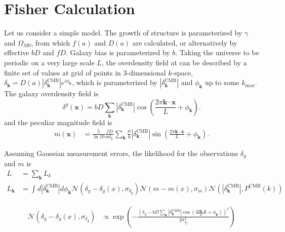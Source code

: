 \documentclass[11pt, oneside]{article}   	%
\begin{document}
\section{Fisher Calculation}
Let us consider a simple model.
The growth of structure is
parameterized by $\gamma$ and $\Omega_{M0}$, from which 
$f(a)$ and $D(a)$ are calculated,
or alternatively by effective
$bD$ and $fD$.
Galaxy bias is parameterized by $b$.
Taking the universe to be periodic
on a very large scale $L$, 
the overdensity field at
can be
described by a finite set
of values
at grid of points in 3-dimensional
$k$-space, $\delta_{\mathbf{k}} = D(a) |\delta^{\text{CMB}}_{\mathbf{k}}| e^{i\phi_{\mathbf{k}}}$,
which is parameterized by
$|\delta^{\text{CMB}}_{\mathbf{k}}|$
and $\phi_{\mathbf{k}}$ up to some
$k_{\text{max}}$.  The galaxy
overdensity field is
\begin{equation}
    \delta^g(\mathbf{x}) = bD \sum_{\mathbf{k}} |\delta^{\text{CMB}}_\mathbf{k}| \cos{\left(\frac{2\pi \mathbf{k} \cdot \mathbf{x}}{L} + \phi_\mathbf{k}\right)}.
\end{equation}
and the peculiar magnitude field is
\begin{align}
       m(\mathbf{x})
       & = \frac{5}{\ln{10}}\frac{fD}{ad_L} \sum_{\mathbf{k}}
       \frac{\mu}{k} |\delta^{\text{CMB}}_\mathbf{k}| \sin{\left(\frac{2\pi \mathbf{k} \cdot \mathbf{x}}{L} + \phi_\mathbf{k}\right)}.
\end{align}

Assuming Gaussian measurement
errors, the likelihood for
the observations $\delta_g$
and $m$ is
\begin{align}
    L& =\sum_\mathbf{k} L_k\\
    L_\mathbf{k}& = \int d|\delta^{\text{CMB}}_\mathbf{k}| d\phi_\mathbf{k}
    \mathcal{N}(\delta_g-\delta_g(x),\sigma_{\delta_g})
    \mathcal{N}(m-m(x),\sigma_m)
    \mathcal{N}(|\delta^{\text{CMB}}_\mathbf{k}|,P^{\text{CMB}}(k))
\end{align}

\begin{align}
     \mathcal{N}(\delta_g-\delta_g(x),\sigma_{\delta_g})& \propto
         \exp{
         \left(
         -
         \frac{\left(\delta_g-bD \sum_{\mathbf{k}} |\delta^{\text{CMB}}_\mathbf{k}| \cos{\left(\frac{2\pi \mathbf{k} \cdot \mathbf{x}}{L} + \phi_\mathbf{k}\right)}\right)^2}{2\sigma^2_{\delta_g}}
         \right)}
\end{align}
\end{document}
